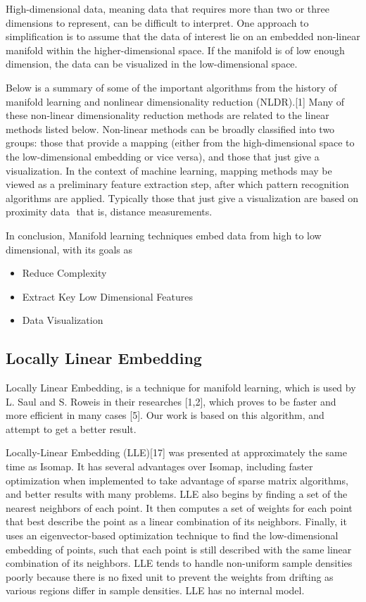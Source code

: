 \documentclass[12pt]{article} %
\begin{document}
High-dimensional data, meaning data that requires more than two or three dimensions to represent, can be difficult to interpret. One approach to simplification is to assume that the data of interest lie on an embedded non-linear manifold within the higher-dimensional space. If the manifold is of low enough dimension, the data can be visualized in the low-dimensional space.

Below is a summary of some of the important algorithms from the history of manifold learning and nonlinear dimensionality reduction (NLDR).[1] Many of these non-linear dimensionality reduction methods are related to the linear methods listed below. Non-linear methods can be broadly classified into two groups: those that provide a mapping (either from the high-dimensional space to the low-dimensional embedding or vice versa), and those that just give a visualization. In the context of machine learning, mapping methods may be viewed as a preliminary feature extraction step, after which pattern recognition algorithms are applied. Typically those that just give a visualization are based on proximity data  that is, distance measurements.

In conclusion, Manifold learning techniques embed data from high to low dimensional, with its goals as
\begin{itemize}
  \item Reduce Complexity
  \item Extract Key Low Dimensional Features
  \item Data Visualization
\end{itemize}


\subsection{Locally Linear Embedding} %
Locally Linear Embedding, is a technique for manifold learning, which is used by L. Saul and S. Roweis in their researches [1,2], which proves to be faster and more efficient in many cases [5]. Our work is based on this algorithm, and attempt to get a better result.

Locally-Linear Embedding (LLE)[17] was presented at approximately the same time as Isomap. It has several advantages over Isomap, including faster optimization when implemented to take advantage of sparse matrix algorithms, and better results with many problems. LLE also begins by finding a set of the nearest neighbors of each point. It then computes a set of weights for each point that best describe the point as a linear combination of its neighbors. Finally, it uses an eigenvector-based optimization technique to find the low-dimensional embedding of points, such that each point is still described with the same linear combination of its neighbors. LLE tends to handle non-uniform sample densities poorly because there is no fixed unit to prevent the weights from drifting as various regions differ in sample densities. LLE has no internal model.
\end{document}
